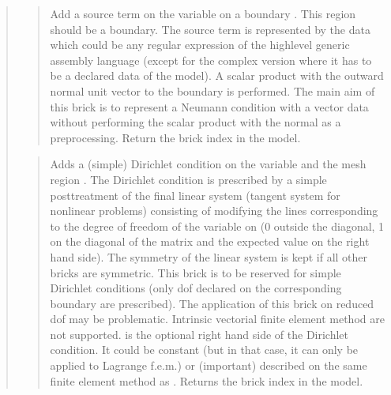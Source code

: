 \documentclass[a4paper,11pt,english]{sphinxmanual}
\begin{document}
\begin{quote}
\begin{quote}

Add a source term on the variable  on a boundary .
This region should be a boundary. The source term is
represented by the data  which could be any regular
expression of the high\sphinxhyphen{}level generic assembly language (except
for the complex version where it has to be a declared data of
the model). A scalar
product with the outward normal unit vector to the boundary is performed.
The main aim of this brick is to represent a Neumann condition with a
vector data without performing the scalar product with the normal as a
pre\sphinxhyphen{}processing. Return the brick index in the model.
\end{quote}

\begin{quote}

Adds a (simple) Dirichlet condition on the variable  and
the mesh region . The Dirichlet condition is prescribed by
a simple post\sphinxhyphen{}treatment of the final linear system (tangent system
for nonlinear problems) consisting of modifying the lines corresponding
to the degree of freedom of the variable on  (0 outside the
diagonal, 1 on the diagonal of the matrix and the expected value on
the right hand side).
The symmetry of the linear system is kept if all other bricks are
symmetric.
This brick is to be reserved for simple Dirichlet conditions (only dof
declared on the corresponding boundary are prescribed). The application
of this brick on reduced dof may be problematic. Intrinsic vectorial
finite element method are not supported.
 is the optional right hand side of  the Dirichlet condition.
It could be constant (but in that case, it can only be applied to
Lagrange f.e.m.) or (important) described on the same finite
element method as .
Returns the brick index in the model.
\end{quote}

\begin{quote}


\end{quote}
\end{quote}
\end{document}
